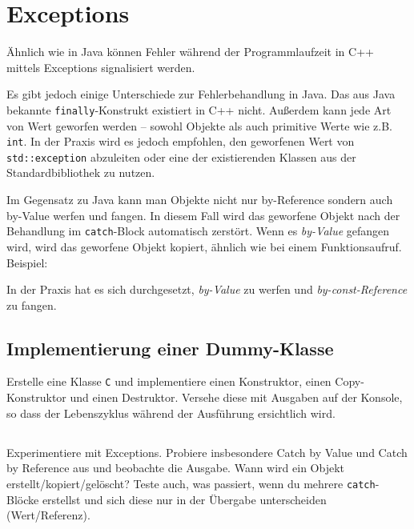 \section{\ExercisePrefixMemory Exceptions}
Ähnlich wie in Java können Fehler während der Programmlaufzeit in C++ mittels Exceptions signalisiert werden.


Es gibt jedoch einige Unterschiede zur Fehlerbehandlung in Java.
Das aus Java bekannte \lstinline{finally}-Konstrukt existiert in C++ nicht.
Außerdem kann jede Art von Wert geworfen werden -- sowohl Objekte als auch primitive Werte wie z.B. \lstinline{int}.
In der Praxis wird es jedoch empfohlen, den geworfenen Wert von \lstinline{std::exception} abzuleiten oder eine der existierenden Klassen aus der Standardbibliothek zu nutzen.

Im Gegensatz zu Java kann man Objekte nicht nur \glqq by-Reference\grqq{}  sondern auch \glqq by-Value\grqq{}  werfen und fangen.
In diesem Fall wird das geworfene Objekt nach der Behandlung im \lstinline{catch}-Block automatisch zerstört.
Wenn es \emph{by-Value} gefangen wird, wird das geworfene Objekt kopiert, ähnlich wie bei einem Funktionsaufruf.
Beispiel:


In der Praxis hat es sich durchgesetzt, \emph{by-Value} zu werfen und \emph{by-const-Reference} zu fangen.

\subsection{Implementierung einer Dummy-Klasse}
Erstelle eine Klasse \lstinline{C} und implementiere einen Konstruktor, einen Copy-Konstruktor und einen Destruktor.
Versehe diese mit Ausgaben auf der Konsole, so dass der Lebenszyklus während der Ausführung ersichtlich wird.

\subsection{}
Experimentiere mit Exceptions.
Probiere insbesondere Catch by Value und Catch by Reference aus und beobachte die Ausgabe.
Wann wird ein Objekt erstellt/kopiert/gelöscht?
Teste auch, was passiert, wenn du mehrere \lstinline{catch}-Blöcke erstellst und sich diese nur in der Übergabe unterscheiden (Wert/Referenz).

